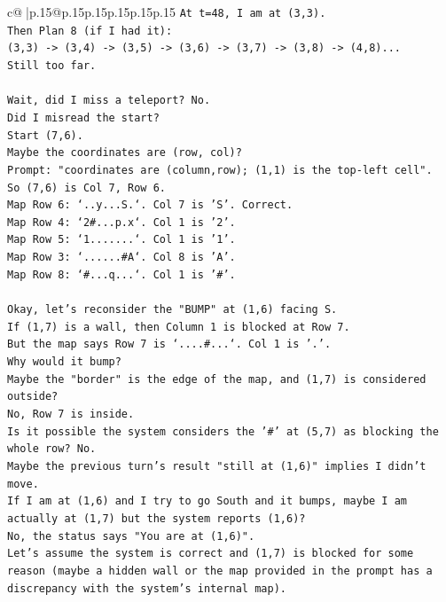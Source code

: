 \documentclass{article}
\begin{document}
{\begin{supertabular}{c@{$\;$}|p{.15\linewidth}@{}p{.15\linewidth}p{.15\linewidth}p{.15\linewidth}p{.15\linewidth}p{.15\linewidth}}
{{{\texttt{At t=48, I am at (3,3).} \\
\texttt{Then Plan 8 (if I had it):} \\
\texttt{(3,3) {-}> (3,4) {-}> (3,5) {-}> (3,6) {-}> (3,7) {-}> (3,8) {-}> (4,8)...} \\
\texttt{Still too far.} \\
\\ 
\texttt{Wait, did I miss a teleport? No.} \\
\texttt{Did I misread the start?} \\
\texttt{Start (7,6).} \\
\texttt{Maybe the coordinates are (row, col)?} \\
\texttt{Prompt: "coordinates are (column,row); (1,1) is the top{-}left cell".} \\
\texttt{So (7,6) is Col 7, Row 6.} \\
\texttt{Map Row 6: `..y...S.`. Col 7 is 'S'. Correct.} \\
\texttt{Map Row 4: `2\#...p.x`. Col 1 is '2'.} \\
\texttt{Map Row 5: `1.......`. Col 1 is '1'.} \\
\texttt{Map Row 3: `......\#A`. Col 8 is 'A'.} \\
\texttt{Map Row 8: `\#...q...`. Col 1 is '\#'.} \\
\\ 
\texttt{Okay, let's reconsider the "BUMP" at (1,6) facing S.} \\
\texttt{If (1,7) is a wall, then Column 1 is blocked at Row 7.} \\
\texttt{But the map says Row 7 is `....\#...`. Col 1 is '.'.} \\
\texttt{Why would it bump?} \\
\texttt{Maybe the "border" is the edge of the map, and (1,7) is considered outside?} \\
\texttt{No, Row 7 is inside.} \\
\texttt{Is it possible the system considers the '\#' at (5,7) as blocking the whole row? No.} \\
\texttt{Maybe the previous turn's result "still at (1,6)" implies I didn't move.} \\
\texttt{If I am at (1,6) and I try to go South and it bumps, maybe I am actually at (1,7) but the system reports (1,6)?} \\
\texttt{No, the status says "You are at (1,6)".} \\
\texttt{Let's assume the system is correct and (1,7) is blocked for some reason (maybe a hidden wall or the map provided in the prompt has a discrepancy with the system's internal map).} \\
}}}
\end{supertabular}}
\end{document}
